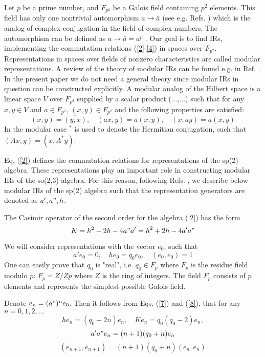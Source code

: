 \documentclass[a4paper,12pt]{article}%
\begin{document}
Let $p$ be a prime number, and $F_{p^2}$ be a Galois field
containing $p^2$ elements. This field has only one
nontrivial automorphism $a\rightarrow {\bar a}$ (see e.g.
Refs. \cite{VDW,IR,lev2}) which is the analog of complex
conjugation in the field of complex numbers. The automorphism
can be defined as $a\rightarrow {\bar a}= a^p$ \cite{VDW,IR}. 
Our goal is to find IRs, implementing the commutation relations 
(\ref{2}-\ref{4}) in
spaces over $F_{p^2}$. Representations in spaces over fields
of nonzero characteristics are called modular representations.
A review of the theory of modular IRs can be found e.g. in
Ref. \cite{FrPa}. In the present paper we do not need a
general theory since modular IRs in question can be
constructed explicitly. A modular analog of the Hilbert
space is a linear space $V$ over $F_{p^2}$ supplied by a
scalar product (...,...) such that for any $x,y\in V$
and $a\in F_{p^2}$, $(x,y)\in F_{p^2}$
and the following properties are satisfied: 
\begin{equation}
(x,y) =\overline{(y,x)},\quad (ax,y)=\bar{a}(x,y),\quad 
(x,ay)=a(x,y)
\label{6}
\end{equation}   
In the modular case $^*$ is used to denote the Hermitian
conjugation, such that $(Ax,y)=(x,A^*y)$.

Eq. (\ref{2}) defines the commutation relations for 
representations of the sp(2) algebra. These representations
play an important role in constructing modular IRs of the
so(2,3) algebra. For this reason, following Refs. 
\cite{lev1,lev2}, we describe below modular IRs of the
sp(2) algebra such that the representation generators are
denoted as $a',a",h$. 

The  Casimir operator of the second order for the algebra
(\ref{2}) has the form
\begin{equation}
K=h^2-2h-4a"a'=h^2+2h-4a'a"
\label{7}
\end{equation}

We will consider representations with the vector $e_0$, such that
\begin{equation}
a'e_0=0,\quad he_0=q_0e_0,\quad (e_0,e_0)=1 
\label{8}
\end{equation} 
One can easily prove \cite{lev1,lev2} that $q_0$ is
"real", i.e. $q_0\in F_p$ where $F_p$ is the residue field
modulo $p$: $F_p=Z/Zp$ where $Z$ is the ring of integers.
The field $F_p$ consists of $p$ elements and represents the
simplest possible Galois field.

Denote $e_n =(a")^ne_0$.
Then it follows from Eqs. (\ref{7}) and (\ref{8}),
that for any $n=0,1,2,...$
\begin{equation}
he_n=(q_0+2n)e_n,\quad Ke_n=q_0(q_0-2)e_n, 
\label{9}
\end{equation} 
\begin{equation}
a'a"e_n=(n+1)(q_0+n)e_n
\label{10}
\end{equation}
\begin{equation}
(e_{n+1},e_{n+1})=(n+1)(q_0+n)(e_n,e_n)
\label{11}
\end{equation}
\end{document}
